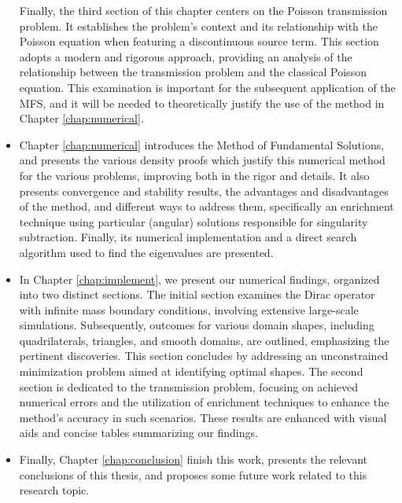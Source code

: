 \begin{itemize}
Finally, the third section of this chapter centers on the Poisson transmission problem. It establishes the problem's context and its relationship with the Poisson equation when featuring a discontinuous source term. This section adopts a modern and rigorous approach, providing an analysis of the relationship between the transmission problem and the classical Poisson equation. This examination is important for the subsequent application of the \ac{MFS}, and it will be needed to theoretically justify the use of the method in Chapter \ref{chap:numerical}.
\item Chapter \ref{chap:numerical} introduces the Method of Fundamental Solutions, and presents the various density proofs which justify this numerical method for the various problems, improving both in the rigor and details. It also presents convergence and stability results, the advantages and disadvantages of the method, and different ways to address them, specifically an enrichment technique using particular (angular) solutions responsible for singularity subtraction. Finally, its numerical implementation and a direct search algorithm used to find the eigenvalues are presented.
\item In Chapter \ref{chap:implement}, we present our numerical findings, organized into two distinct sections. The initial section examines the Dirac operator with infinite mass boundary conditions, involving extensive large-scale simulations. Subsequently, outcomes for various domain shapes, including quadrilaterals, triangles, and smooth domains, are outlined, emphasizing the pertinent discoveries. This section concludes by addressing an unconstrained minimization problem aimed at identifying optimal shapes. The second section is dedicated to the transmission problem, focusing on achieved numerical errors and the utilization of enrichment techniques to enhance the method's accuracy in such scenarios. These results are enhanced with visual aids and concise tables summarizing our findings.
\item Finally, Chapter \ref{chap:conclusion} finish this work, presents the relevant conclusions of this thesis, and proposes some future work related to this research topic.
\end{itemize}


